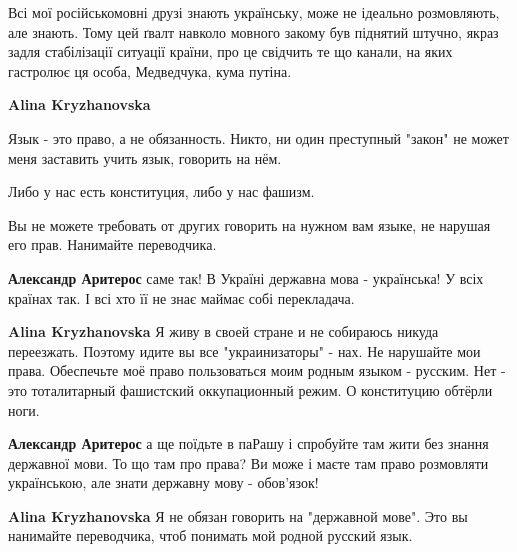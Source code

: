 \begin{itemize}
\begin{itemize}
Всі мої російськомовні друзі знають українську, може не ідеально розмовляють,
але знають. Тому цей ґвалт навколо мовного закому був піднятий штучно, якраз
задля стабілізації ситуації країни, про це свідчить те що канали, на яких
гастролює ця особа, Медведчука, кума путіна.


\textbf{Alina Kryzhanovska} 

Язык - это право, а не обязанность. Никто, ни один преступный "закон" не может
меня заставить учить язык, говорить на нём.

Либо у нас есть конституция, либо у нас фашизм.

Вы не можете требовать от других говорить на нужном вам языке, не нарушая его
прав. Нанимайте переводчика.


\textbf{Александр Аритерос} саме так! В Україні державна мова - українська! У всіх країнах так. І всі хто її не знає маймає собі перекладача.


\textbf{Alina Kryzhanovska} Я живу в своей стране и не собираюсь никуда переезжать. Поэтому идите вы все "украинизаторы" - нах. Не нарушайте мои права. Обеспечьте моё право пользоваться моим родным языком - русским. Нет - это тоталитарный фашистский оккупационный режим. О конституцию обтёрли ноги.


\textbf{Александр Аритерос} а ще поїдьте в паРашу і спробуйте там жити без знання державної мови. То що там про права? Ви може і маєте там право розмовляти українською, але знати державну мову - обов’язок!


\textbf{Alina Kryzhanovska} Я не обязан говорить на "державной мове". Это вы нанимайте переводчика, чтоб понимать мой родной русский язык.



\end{itemize}
\end{itemize}
